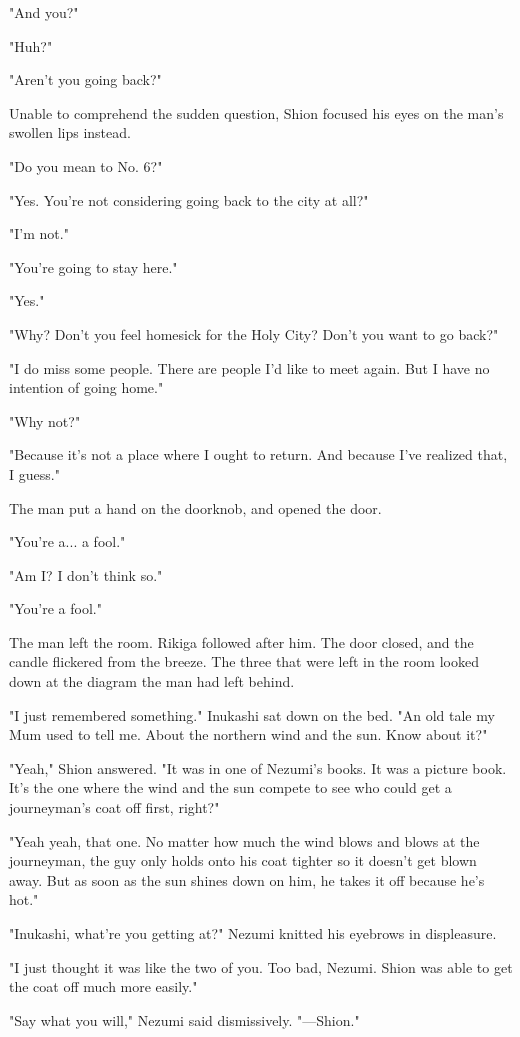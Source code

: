 "And you?"

"Huh?"

"Aren't you going back?"

Unable to comprehend the sudden question, Shion focused his eyes on the
man's swollen lips instead.

"Do you mean to No. 6?"

"Yes. You're not considering going back to the city at all?"

"I'm not."

"You're going to stay here."

"Yes."

"Why? Don't you feel homesick for the Holy City? Don't you want to go
back?"

"I do miss some people. There are people I'd like to meet again. But I
have no intention of going home."

"Why not?"

"Because it's not a place where I ought to return. And because I've
realized that, I guess."

The man put a hand on the doorknob, and opened the door.

"You're a... a fool."

"Am I? I don't think so."

"You're a fool."

The man left the room. Rikiga followed after him. The door closed, and
the candle flickered from the breeze. The three that were left in the
room looked down at the diagram the man had left behind.

"I just remembered something." Inukashi sat down on the bed. "An old
tale my Mum used to tell me. About the northern wind and the sun. Know
about it?"

"Yeah," Shion answered. "It was in one of Nezumi's books. It was a
picture book. It's the one where the wind and the sun compete to see who
could get a journeyman's coat off first, right?"

"Yeah yeah, that one. No matter how much the wind blows and blows at the
journeyman, the guy only holds onto his coat tighter so it doesn't get
blown away. But as soon as the sun shines down on him, he takes it off
because he's hot."

"Inukashi, what're you getting at?" Nezumi knitted his eyebrows in
displeasure.

"I just thought it was like the two of you. Too bad, Nezumi. Shion was
able to get the coat off much more easily."

"Say what you will," Nezumi said dismissively. "---Shion."

